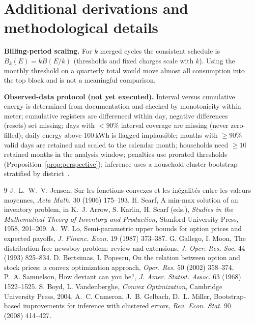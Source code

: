 \documentclass[11pt,a4paper]{article}
\theoremstyle{definition}
\theoremstyle{plain}\newtheorem{sprop}{Proposition}[section]\newtheorem{slemma}[sprop]{Lemma}\newtheorem{scor}[sprop]{Corollary}
\theoremstyle{definition}
\theoremstyle{remark}
\numberwithin{equation}{section}
\begin{document}
\section{Additional derivations and methodological details}\label{sec:S13}

\textbf{Billing-period scaling.} For $k$ merged cycles the consistent schedule is $B_k(E)=kB(E/k)$ (thresholds and fixed charges scale with $k$). Using the monthly threshold on a quarterly total would move almost all consumption into the top block and is not a meaningful comparison.

\textbf{Observed-data protocol (not yet executed).} Interval versus cumulative energy is determined from documentation and checked by monotonicity within meter; cumulative registers are differenced within day, negative differences (resets) set missing; days with $<90\%$ interval coverage are missing (never zero-filled); daily energy above 100\,kWh is flagged implausible; months with $\ge90\%$ valid days are retained and scaled to the calendar month; households need $\ge10$ retained months in the analysis window; penalties use prorated thresholds (Proposition~\ref{prop:perspective}); inference uses a household-cluster bootstrap stratified by district~\cite{cameron}.

\begin{thebibliography}{9}
 J.~L.~W.~V. Jensen, Sur les fonctions convexes et les in\'egalit\'es entre les valeurs moyennes, \emph{Acta Math.} 30 (1906) 175--193.
 H. Scarf, A min-max solution of an inventory problem, in K.~J. Arrow, S. Karlin, H. Scarf (eds.), \emph{Studies in the Mathematical Theory of Inventory and Production}, Stanford University Press, 1958, 201--209.
 A.~W. Lo, Semi-parametric upper bounds for option prices and expected payoffs, \emph{J. Financ. Econ.} 19 (1987) 373--387.
 G. Gallego, I. Moon, The distribution free newsboy problem: review and extensions, \emph{J. Oper. Res. Soc.} 44 (1993) 825--834.
 D. Bertsimas, I. Popescu, On the relation between option and stock prices: a convex optimization approach, \emph{Oper. Res.} 50 (2002) 358--374.
 P.~A. Samuelson, How deviant can you be?, \emph{J. Amer. Statist. Assoc.} 63 (1968) 1522--1525.
 S. Boyd, L. Vandenberghe, \emph{Convex Optimization}, Cambridge University Press, 2004.
 A.~C. Cameron, J.~B. Gelbach, D.~L. Miller, Bootstrap-based improvements for inference with clustered errors, \emph{Rev. Econ. Stat.} 90 (2008) 414--427.
\end{thebibliography}
\end{document}
